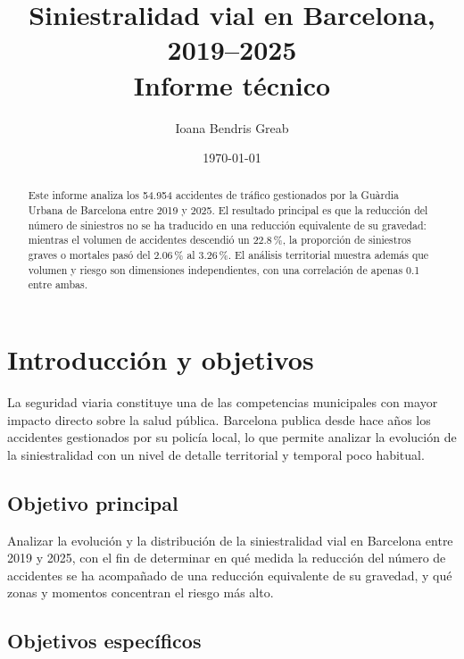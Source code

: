 \documentclass[11pt,a4paper]{article}\usepackage[]{graphicx}\usepackage[]{xcolor}
\title{Siniestralidad vial en Barcelona, 2019--2025\\
       \large Informe técnico}
\author{Ioana Bendris Greab}
\date{\today}
\begin{document}
\maketitle



\begin{abstract}
\noindent
Este informe analiza los 54.954 accidentes de tráfico
gestionados por la Guàrdia Urbana de Barcelona entre 2019 y 2025. El
resultado principal es que la reducción del número de siniestros no se ha
traducido en una reducción equivalente de su gravedad: mientras el volumen
de accidentes descendió un 22.8\,\%, la
proporción de siniestros graves o mortales pasó del
2.06\,\% al 3.26\,\%. El
análisis territorial muestra además que volumen y riesgo son dimensiones
independientes, con una correlación de apenas
0.1 entre ambas.
\end{abstract}

\tableofcontents
\newpage

\section{Introducción y objetivos}

La seguridad viaria constituye una de las competencias municipales con
mayor impacto directo sobre la salud pública. Barcelona publica desde hace
años los accidentes gestionados por su policía local, lo que permite
analizar la evolución de la siniestralidad con un nivel de detalle
territorial y temporal poco habitual.

\subsection{Objetivo principal}

Analizar la evolución y la distribución de la siniestralidad vial en
Barcelona entre 2019 y 2025, con el fin de determinar en qué medida la
reducción del número de accidentes se ha acompañado de una reducción
equivalente de su gravedad, y qué zonas y momentos concentran el riesgo
más alto.

\subsection{Objetivos específicos}
\end{document}
